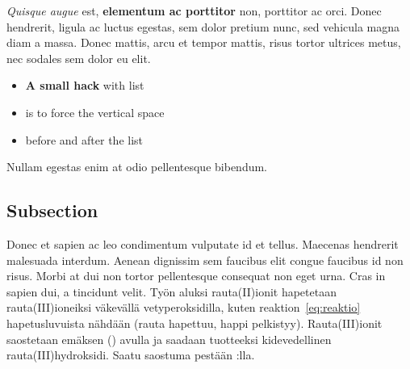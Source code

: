 \textit{Quisque augue} est, \textbf{elementum ac porttitor} non, porttitor ac orci. Donec hendrerit, ligula ac luctus egestas, sem dolor pretium nunc, sed vehicula magna diam a massa. Donec mattis, arcu et tempor mattis, risus tortor ultrices metus, nec sodales sem dolor eu elit.\vspace{-17pt} 
\begin{itemize}
\item \textbf{A small hack} with list
\item is to force the vertical space 
\item before and after the list
\end{itemize}
\vspace{-17pt} Nullam egestas enim at odio pellentesque bibendum. 

\subsection{Subsection}
Donec et sapien ac leo condimentum vulputate id et tellus. Maecenas hendrerit malesuada interdum. Aenean dignissim sem faucibus elit congue faucibus id non risus. Morbi at dui non tortor pellentesque consequat non eget urna. Cras in sapien dui, a tincidunt velit.
Työn aluksi rauta(II)ionit hapetetaan rauta(III)ioneiksi väkevällä vetyperoksidilla, kuten reaktion~\ref{eq:reaktio} hapetusluvuista nähdään (rauta hapettuu, happi pelkistyy).  
Rauta(III)ionit saostetaan emäksen () avulla ja saadaan tuotteeksi kidevedellinen rauta(III)hydroksidi. Saatu saostuma pestään :lla.


